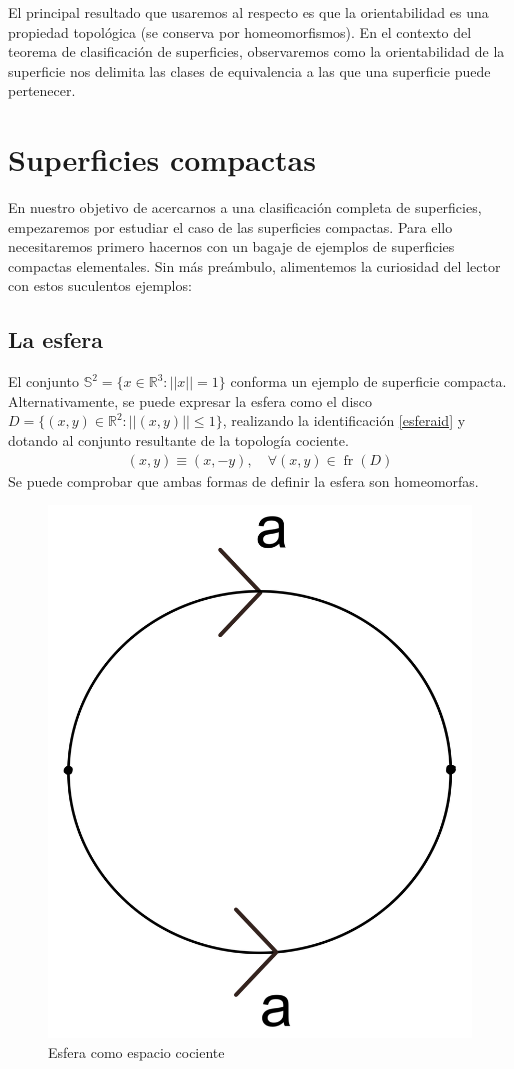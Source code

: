 \documentclass[a4paper,11pt,spanish, twoside, leqno]{tfg-uam}
\DeclareMathOperator{\frontera}{fr}
\theoremstyle{definition}
\begin{document}
El principal resultado que usaremos al respecto es que la orientabilidad es una propiedad topológica (se conserva por homeomorfismos). En el contexto del teorema de clasificación de superficies, observaremos como la orientabilidad de la superficie nos delimita las clases de equivalencia a las que una superficie puede pertenecer.

\section{Superficies compactas}

En nuestro objetivo de acercarnos a una clasificación  completa de superficies, empezaremos por estudiar el caso de las superficies compactas. Para ello necesitaremos primero hacernos con un bagaje de ejemplos de superficies compactas elementales. Sin más preámbulo, alimentemos la curiosidad del lector con estos suculentos ejemplos:

\subsection*{La esfera}
El conjunto $ \mathbb{S}^2 = \{x\in \mathbb{R}^3: ||x||=1 \} $ conforma un ejemplo de superficie compacta. Alternativamente, se puede expresar la esfera como el disco $ D = \{(x,y)\in\mathbb{R}^2: ||(x,y)||\leq1 \} $, realizando la identificación  \ref{esferaid} y dotando al conjunto resultante de la topología cociente.
\begin{align}\label{esferaid}
	(x,y)\equiv(x,-y),\quad\forall(x,y)\in \frontera(D)
\end{align}
Se puede comprobar que ambas formas de definir la esfera son homeomorfas. 

\begin{figure}[h!]
	\centering
	\includegraphics[width=0.15\linewidth]{imagenes/esfera_plana.png}
	\caption{Esfera como espacio cociente}
	\label{fig:esfera expresion canonica}
\end{figure} 
\end{document}
